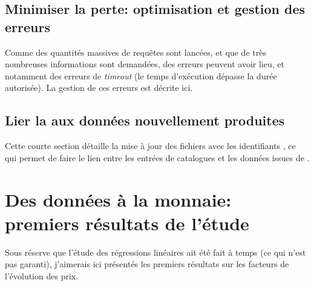 \subsection{Minimiser la perte: optimisation et gestion des erreurs}
Comme des quantités massives de requêtes sont lancées, et que de très nombreuses informations sont demandées, des erreurs peuvent avoir lieu, et notamment des erreurs de \textit{timeout} (le temps d'exécution dépasse la durée autorisée). La gestion de ces erreurs est décrite ici.

\subsection{Lier la \tei{} aux données nouvellement produites}
Cette courte section détaille la mise à jour des fichiers \tei{} avec les identifiants \wkd{}, ce qui permet de faire le lien entre les entrées de catalogues et les données issues de \wkd{}.

\section{Des données à la monnaie: premiers résultats de l'étude}
Sous réserve que l'étude des régressions linéaires ait été fait à temps (ce qui n'est pas garanti), j'aimerais ici présentés les premiers résultats sur les facteurs de l'évolution des prix.